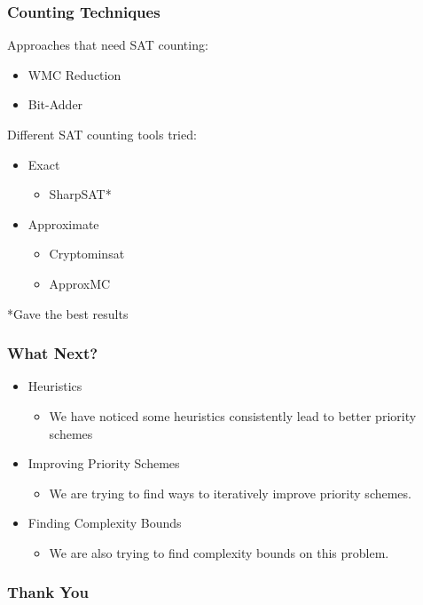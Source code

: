 \documentclass{beamer}
\begin{document}
\begin{frame}
\frametitle{Counting Techniques}
Approaches that need SAT counting:
\begin{itemize}
	\item WMC Reduction
	\item Bit-Adder\\[2ex]
\end{itemize}

Different SAT counting tools tried:
\begin{itemize}
\item Exact
	\begin{itemize}
	\item SharpSAT*
	\end{itemize}

\item Approximate
	\begin{itemize}
	\item Cryptominsat
	\item ApproxMC\\[3ex]
	\end{itemize}
\end{itemize}
*Gave the best results
\end{frame}

\begin{frame}
\frametitle{What Next?}
	\begin{itemize}
	\item Heuristics
		\begin{itemize}
		\item We have noticed some heuristics consistently lead to better priority schemes
		\end{itemize}
	\item Improving Priority Schemes
		\begin{itemize}
		\item We are trying to find ways to iteratively improve priority schemes.
		\end{itemize}
	\item Finding Complexity Bounds
		\begin{itemize}
		\item We are also trying to find complexity bounds on this problem.
		\end{itemize}
	\end{itemize}
\end{frame}


\begin{frame}
\frametitle{Thank You}
\end{frame}
\end{document}
